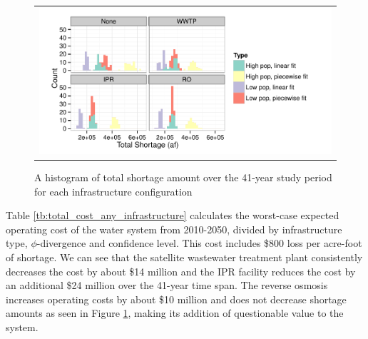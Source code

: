 \documentclass[11pt]{article}
\theoremstyle{plain}
\theoremstyle{definition}
\theoremstyle{remark}
\begin{document}
\begin{figure}
	\centering
	\begin{tabular}{c}
		\includegraphics*[width=.9\textwidth]{images/combined_shortage_frequency}%
	\end{tabular}
	\caption{
		A histogram of total shortage amount over the 41-year study period for each infrastructure configuration
	}
	\label{fig:shortage_frequency_combined}
\end{figure}

Table \ref{tb:total_cost_any_infrastructure} calculates the worst-case expected operating cost of the water system from 2010-2050, divided by infrastructure type, $\phi$-divergence and confidence level.
This cost includes \$800 loss per acre-foot of shortage.
We can see that the satellite wastewater treatment plant consistently decreases the cost by about \$14 million and the IPR facility reduces the cost by an additional \$24 million over the 41-year time span.
The reverse osmosis increases operating costs by about \$10 million and does not decrease shortage amounts as seen in Figure \ref{fig:shortage_frequency_combined}, making its addition of questionable value to the system.
\end{document}
